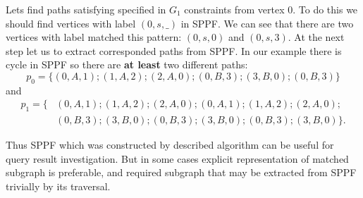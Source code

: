 Lets find paths satisfying specified in $G_1$ constraints from vertex $0$.
To do this we should find vertices with label $(0, s, \_)$ in SPPF.
We can see that there are two vertices with label matched this pattern: $(0, s, 0)$ and $(0, s, 3)$.
At the next step let us to extract corresponded paths from SPPF.
In our example there is cycle in SPPF so there are \textbf{at least} two different paths: $$p_0=\{(0,A,1);(1,A,2);(2,A,0);(0,B,3);(3,B,0);(0,B,3)\}$$ and 
\begin{align*}
p_1=\{&(0,A,1);(1,A,2);(2,A,0);(0,A,1);(1,A,2);(2,A,0);\\ &(0,B,3);(3,B,0);(0,B,3);(3,B,0);(0,B,3);(3,B,0)\}.
\end{align*}


Thus SPPF which was constructed by described algorithm can be useful for query result investigation. 
But in some cases explicit representation of matched subgraph is preferable, and required subgraph that may be extracted from SPPF trivially by its traversal.
